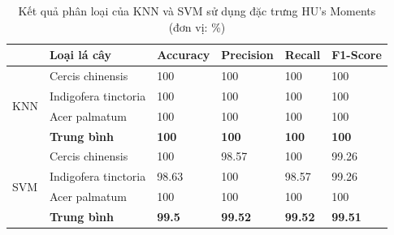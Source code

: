 \documentclass[a4paper]{article}
\begin{document}
\begin{table}[h]
    \caption{Kết quả phân loại của KNN và SVM sử dụng đặc trưng HU's Moments (đơn vị: \%)}
    \label{tab:kq_HU}
    \begin{center}
        \renewcommand{\arraystretch}{1} 
        \begin{tabular}{|p{1.5cm}|p{4cm}|p{2cm}|p{2cm}|p{2cm}|p{2cm}|}
            \hline
            \textbf{} & \textbf{Loại lá cây} & \textbf{Accuracy} & \textbf{Precision} & \textbf{Recall} & \textbf{F1-Score}  \\
            \hline
            \multirow{4}{1cm}{\centering KNN} & Cercis chinensis & 100 & 100 & 100 & 100 \\
            \cline{2-6}
            &  Indigofera tinctoria & 100 & 100 & 100 & 100  \\
            \cline{2-6}
            &  Acer palmatum & 100 & 100 & 100 & 100  \\
            \cline{2-6}
            & \textbf{Trung bình} & \textbf{100} & \textbf{100} & \textbf{100} & \textbf{100} \\
            \hline
            \multirow{4}{1cm}{\centering SVM} & Cercis chinensis & 100 & 98.57 & 100 & 99.26   \\
            \cline{2-6}
            &  Indigofera tinctoria & 98.63 & 100 & 98.57 & 99.26   \\
            \cline{2-6}
            &  Acer palmatum & 100 & 100 & 100 & 100  \\
            \cline{2-6}
            & \textbf{Trung bình} & \textbf{99.5} & \textbf{99.52} & \textbf{99.52} & \textbf{99.51} \\
            \hline
        \end{tabular}
    \end{center}
\end{table}
\end{document}
